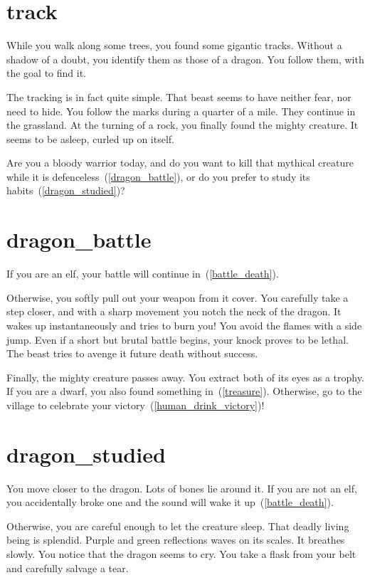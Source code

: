 \section{track}

While you walk along some trees, you found some gigantic tracks. Without a
shadow of a doubt, you identify them as those of a dragon. You follow them, with
the goal to find it.

The tracking is in fact quite simple. That beast seems to have neither fear, nor
need to hide. You follow the marks during a quarter of a mile. They continue in
the grassland. At the turning of a rock, you finally found the mighty creature.
It seems to be asleep, curled up on itself.

Are you a bloody warrior today, and do you want to kill that mythical creature while it
is defenceless~(\ref{dragon_battle}), or do you prefer to study its
habits~(\ref{dragon_studied})?

\section{dragon_battle}

If you are an elf, your battle will continue in~(\ref{battle_death}).

\medbreak

Otherwise, you softly pull out your weapon from it cover. You carefully take a
step closer, and with a sharp movement you notch the neck of the dragon. It wakes
up instantaneously and tries to burn you! You avoid the flames with a side jump.
Even if a short but brutal battle begins, your knock proves to be lethal. The
beast tries to avenge it future death without success.

Finally, the mighty creature passes away. You extract both of its eyes as a
trophy. If you are a dwarf, you also found something in~(\ref{treasure}).
Otherwise, go to the village to celebrate your
victory~(\ref{human_drink_victory})!

\section{dragon_studied}

You move closer to the dragon. Lots of bones lie around it. If you are not an
elf, you accidentally broke one and the sound will wake it
up~(\ref{battle_death}).

\medbreak

Otherwise, you are careful enough to let the creature sleep. That deadly living
being is splendid. Purple and green reflections waves on its scales. It breathes
slowly. You notice that the dragon seems to cry. You take a flask from your belt
and carefully salvage a tear.

